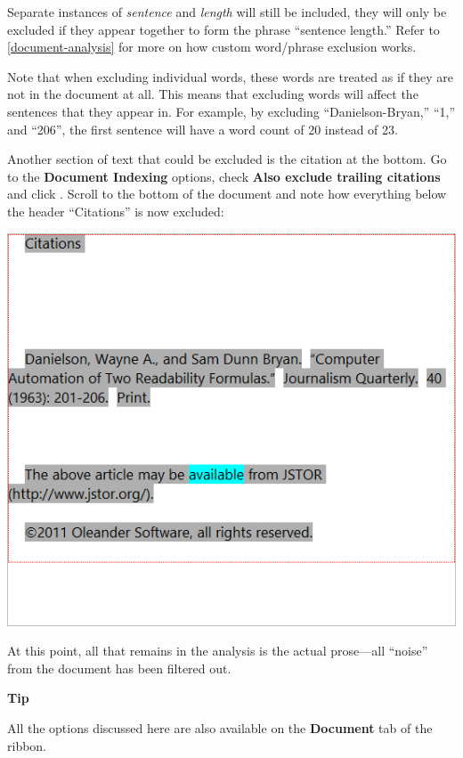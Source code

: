 \documentclass[
]{book}
\newenvironment{tipsection}
    {
    \begin{tcolorbox}[colframe=lightgray,colback=lightyellow,arc=3mm]
    \faLightbulb[regular] \textbf{Tip} \newline
    }
    {
    \end{tcolorbox}
    }
\theoremstyle{definition}
\theoremstyle{definition}
\theoremstyle{definition}
\theoremstyle{definition}
\theoremstyle{remark}
\begin{document}
Separate instances of \emph{sentence} and \emph{length} will still be included, they will only be excluded if they appear together to form the phrase ``sentence length.'' Refer to \ref{document-analysis} for more on how custom word/phrase exclusion works.

Note that when excluding individual words, these words are treated as if they are not in the document at all. This means that excluding words will affect the sentences that they appear in. For example, by excluding ``Danielson-Bryan,'' ``1,'' and ``206'', the first sentence will have a word count of 20 instead of 23.

Another section of text that could be excluded is the citation at the bottom. Go to the \textbf{Document Indexing} options, check \textbf{Also exclude trailing citations} and click . Scroll to the bottom of the document and note how everything below the header ``Citations'' is now excluded:

\includegraphics{Images/ExclusionExampleCitationExcluded.png}

At this point, all that remains in the analysis is the actual prose---all ``noise'' from the document has been filtered out.

\begin{tipsection}
All the options discussed here are also available on the \textbf{Document} tab of the ribbon.

\end{tipsection}
\end{document}
